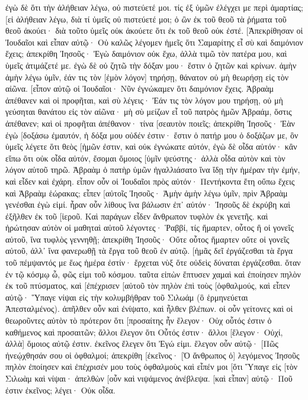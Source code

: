 ἐγὼ δὲ ὅτι τὴν ἀλήθειαν λέγω, οὐ πιστεύετέ μοι. 
τίς ἐξ ὑμῶν ἐλέγχει με περὶ ἁμαρτίας; [εἰ ἀλήθειαν λέγω, διὰ τί ὑμεῖς οὐ πιστεύετέ μοι; 
ὁ ὢν ἐκ τοῦ θεοῦ τὰ ῥήματα τοῦ θεοῦ ἀκούει· διὰ τοῦτο ὑμεῖς οὐκ ἀκούετε ὅτι ἐκ τοῦ θεοῦ οὐκ ἐστέ. 
[Ἀπεκρίθησαν οἱ Ἰουδαῖοι καὶ εἶπαν αὐτῷ· Οὐ καλῶς λέγομεν ἡμεῖς ὅτι Σαμαρίτης εἶ σὺ καὶ δαιμόνιον ἔχεις; 
ἀπεκρίθη Ἰησοῦς· Ἐγὼ δαιμόνιον οὐκ ἔχω, ἀλλὰ τιμῶ τὸν πατέρα μου, καὶ ὑμεῖς ἀτιμάζετέ με. 
ἐγὼ δὲ οὐ ζητῶ τὴν δόξαν μου· ἔστιν ὁ ζητῶν καὶ κρίνων. 
ἀμὴν ἀμὴν λέγω ὑμῖν, ἐάν τις τὸν [ἐμὸν λόγον] τηρήσῃ, θάνατον οὐ μὴ θεωρήσῃ εἰς τὸν αἰῶνα. 
[εἶπον αὐτῷ οἱ Ἰουδαῖοι· Νῦν ἐγνώκαμεν ὅτι δαιμόνιον ἔχεις. Ἀβραὰμ ἀπέθανεν καὶ οἱ προφῆται, καὶ σὺ λέγεις· Ἐάν τις τὸν λόγον μου τηρήσῃ, οὐ μὴ γεύσηται θανάτου εἰς τὸν αἰῶνα· 
μὴ σὺ μείζων εἶ τοῦ πατρὸς ἡμῶν Ἀβραάμ, ὅστις ἀπέθανεν; καὶ οἱ προφῆται ἀπέθανον· τίνα [σεαυτὸν ποιεῖς; 
ἀπεκρίθη Ἰησοῦς· Ἐὰν ἐγὼ [δοξάσω ἐμαυτόν, ἡ δόξα μου οὐδέν ἐστιν· ἔστιν ὁ πατήρ μου ὁ δοξάζων με, ὃν ὑμεῖς λέγετε ὅτι θεὸς [ἡμῶν ἐστιν, 
καὶ οὐκ ἐγνώκατε αὐτόν, ἐγὼ δὲ οἶδα αὐτόν· κἂν εἴπω ὅτι οὐκ οἶδα αὐτόν, ἔσομαι ὅμοιος [ὑμῖν ψεύστης· ἀλλὰ οἶδα αὐτὸν καὶ τὸν λόγον αὐτοῦ τηρῶ. 
Ἀβραὰμ ὁ πατὴρ ὑμῶν ἠγαλλιάσατο ἵνα ἴδῃ τὴν ἡμέραν τὴν ἐμήν, καὶ εἶδεν καὶ ἐχάρη. 
εἶπον οὖν οἱ Ἰουδαῖοι πρὸς αὐτόν· Πεντήκοντα ἔτη οὔπω ἔχεις καὶ Ἀβραὰμ ἑώρακας; 
εἶπεν [αὐτοῖς Ἰησοῦς· Ἀμὴν ἀμὴν λέγω ὑμῖν, πρὶν Ἀβραὰμ γενέσθαι ἐγὼ εἰμί. 
ἦραν οὖν λίθους ἵνα βάλωσιν ἐπ᾽ αὐτόν· Ἰησοῦς δὲ ἐκρύβη καὶ ἐξῆλθεν ἐκ τοῦ [ἱεροῦ. 
Καὶ παράγων εἶδεν ἄνθρωπον τυφλὸν ἐκ γενετῆς. 
καὶ ἠρώτησαν αὐτὸν οἱ μαθηταὶ αὐτοῦ λέγοντες· Ῥαββί, τίς ἥμαρτεν, οὗτος ἢ οἱ γονεῖς αὐτοῦ, ἵνα τυφλὸς γεννηθῇ; 
ἀπεκρίθη Ἰησοῦς· Οὔτε οὗτος ἥμαρτεν οὔτε οἱ γονεῖς αὐτοῦ, ἀλλ᾽ ἵνα φανερωθῇ τὰ ἔργα τοῦ θεοῦ ἐν αὐτῷ. 
[ἡμᾶς δεῖ ἐργάζεσθαι τὰ ἔργα τοῦ πέμψαντός με ἕως ἡμέρα ἐστίν· ἔρχεται νὺξ ὅτε οὐδεὶς δύναται ἐργάζεσθαι. 
ὅταν ἐν τῷ κόσμῳ ὦ, φῶς εἰμι τοῦ κόσμου. 
ταῦτα εἰπὼν ἔπτυσεν χαμαὶ καὶ ἐποίησεν πηλὸν ἐκ τοῦ πτύσματος, καὶ [ἐπέχρισεν [αὐτοῦ τὸν πηλὸν ἐπὶ τοὺς [ὀφθαλμούς, 
καὶ εἶπεν αὐτῷ· Ὕπαγε νίψαι εἰς τὴν κολυμβήθραν τοῦ Σιλωάμ (ὃ ἑρμηνεύεται Ἀπεσταλμένος). ἀπῆλθεν οὖν καὶ ἐνίψατο, καὶ ἦλθεν βλέπων. 
οἱ οὖν γείτονες καὶ οἱ θεωροῦντες αὐτὸν τὸ πρότερον ὅτι [προσαίτης ἦν ἔλεγον· Οὐχ οὗτός ἐστιν ὁ καθήμενος καὶ προσαιτῶν; 
ἄλλοι ἔλεγον ὅτι Οὗτός ἐστιν· ἄλλοι [ἔλεγον· Οὐχί, ἀλλὰ] ὅμοιος αὐτῷ ἐστιν. ἐκεῖνος ἔλεγεν ὅτι Ἐγώ εἰμι. 
ἔλεγον οὖν αὐτῷ· [Πῶς ἠνεῴχθησάν σου οἱ ὀφθαλμοί; 
ἀπεκρίθη [ἐκεῖνος· [Ὁ ἄνθρωπος ὁ] λεγόμενος Ἰησοῦς πηλὸν ἐποίησεν καὶ ἐπέχρισέν μου τοὺς ὀφθαλμοὺς καὶ εἶπέν μοι [ὅτι Ὕπαγε εἰς [τὸν Σιλωὰμ καὶ νίψαι· ἀπελθὼν [οὖν καὶ νιψάμενος ἀνέβλεψα. 
[καὶ εἶπαν] αὐτῷ· Ποῦ ἐστιν ἐκεῖνος; λέγει· Οὐκ οἶδα. 
